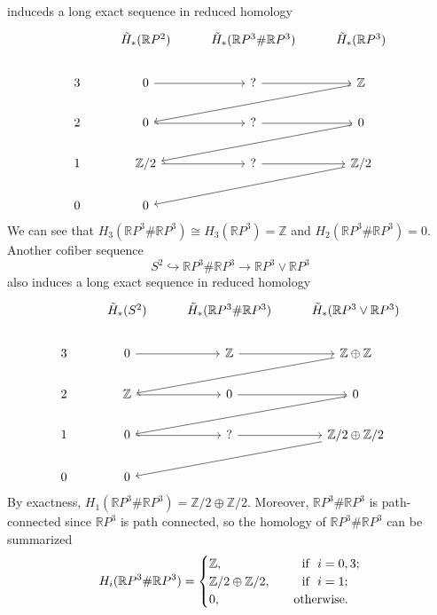 \documentclass[a4paper, 12pt]{article}
\begin{document}
\begin{solution}
\begin{enumerate}[(1)]
induceds a long exact sequence in reduced homology 
\[\begin{tikzcd}
	& {\tilde{H}_*(\mathbb{R}P^2)} & {\tilde{H}_*(\mathbb{R}P^3\#\mathbb{R}P^3)} & {\tilde{H}_*(\mathbb{R}P^3)} \\
	3 & 0 & {?} & {\mathbb{Z}} \\
	2 & 0 & {?} & 0 \\
	1 & {\mathbb{Z}/2} & {?} & {\mathbb{Z}/2} \\
	0 & 0
	\arrow[from=2-2, to=2-3]
	\arrow[from=2-3, to=2-4]
	\arrow[from=2-4, to=3-2]
	\arrow[from=3-2, to=3-3]
	\arrow[from=3-3, to=3-4]
	\arrow[from=3-4, to=4-2]
	\arrow[from=4-2, to=4-3]
	\arrow[from=4-3, to=4-4]
	\arrow[from=4-4, to=5-2]
\end{tikzcd}\]
We can see that \(H_3(\mathbb{R}P^3\#\mathbb{R}P^3)\cong H_3(\mathbb{R}P^3)=\mathbb{Z}\) and \(H_2(\mathbb{R}P^3\# \mathbb{R}P^3)=0\). Another cofiber sequence 
\[S^2\hookrightarrow \mathbb{R}P^3\#\mathbb{R}P^3\rightarrow \mathbb{R}P^3\vee \mathbb{R}P^3\]
also induces a long exact sequence in reduced homology 
\[\begin{tikzcd}
	& {\tilde{H}_*(S^2)} & {\tilde{H}_*(\mathbb{R}P^3\#\mathbb{R}P^3)} & {\tilde{H}_*(\mathbb{R}P^3\vee \mathbb{R}P^3)} \\
	3 & 0 & {\mathbb{Z}} & {\mathbb{Z}\oplus \mathbb{Z}} \\
	2 & {\mathbb{Z}} & 0 & 0 \\
	1 & 0 & {?} & {\mathbb{Z}/2\oplus\mathbb{Z}/2} \\
	0 & 0
	\arrow[from=2-2, to=2-3]
	\arrow[from=2-3, to=2-4]
	\arrow[from=2-4, to=3-2]
	\arrow[from=3-2, to=3-3]
	\arrow[from=3-3, to=3-4]
	\arrow[from=3-4, to=4-2]
	\arrow[from=4-2, to=4-3]
	\arrow[from=4-3, to=4-4]
	\arrow[from=4-4, to=5-2]
\end{tikzcd}\]
By exactness, \(H_1(\mathbb{R}P^3\# \mathbb{R}P^3)=\mathbb{Z}/2\oplus \mathbb{Z}/2\). Moreover, \(\mathbb{R}P^3\# \mathbb{R}P^3\) is path-connected since \(\mathbb{R}P^3\) is path connected, so the homology of \(\mathbb{R}P^3\# \mathbb{R}P^3\) can be summarized 
\[H_i(\mathbb{R}P^3\# \mathbb{R}P^3)=\begin{cases}
	\mathbb{Z},&\ \ \ \ \ \text{if}\ \  i=0,3;\\ 
	\mathbb{Z}/2\oplus \mathbb{Z}/2,&\ \ \ \ \ \text{if}\ \  i=1;\\ 
	0,&\ \ \ \text{otherwise}.
\end{cases}\]
\end{enumerate} 
\end{solution}
\end{document}
